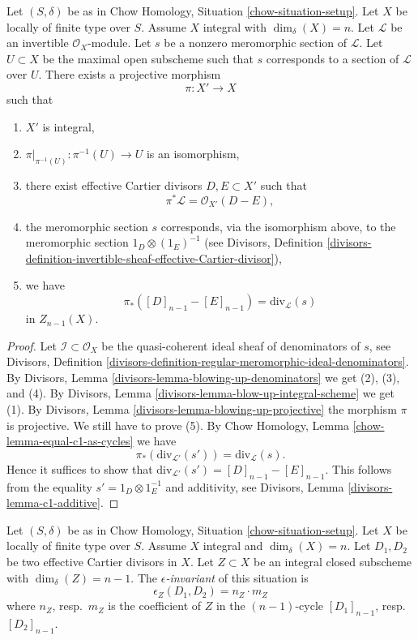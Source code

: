 \begin{lemma}
\label{lemma-blowing-up-denominators}
Let $(S, \delta)$ be as in Chow Homology, Situation \ref{chow-situation-setup}.
Let $X$ be locally of finite type over $S$.
Assume $X$ integral with $\dim_\delta(X) = n$.
Let $\mathcal{L}$ be an invertible $\mathcal{O}_X$-module.
Let $s$ be a nonzero meromorphic section of $\mathcal{L}$.
Let $U \subset X$ be the maximal open subscheme such that
$s$ corresponds to a section of $\mathcal{L}$ over $U$.
There exists a projective morphism
$$
\pi : X' \longrightarrow X
$$
such that
\begin{enumerate}
\item $X'$ is integral,
\item $\pi|_{\pi^{-1}(U)} : \pi^{-1}(U) \to U$ is an isomorphism,
\item there exist effective Cartier divisors $D, E \subset X'$
such that
$$
\pi^*\mathcal{L} = \mathcal{O}_{X'}(D - E),
$$
\item the meromorphic section $s$ corresponds, via the isomorphism above,
to the meromorphic section $1_D \otimes (1_E)^{-1}$ (see
Divisors, Definition
\ref{divisors-definition-invertible-sheaf-effective-Cartier-divisor}),
\item we have
$$
\pi_*([D]_{n - 1} - [E]_{n - 1}) = \text{div}_\mathcal{L}(s)
$$
in $Z_{n - 1}(X)$.
\end{enumerate}
\end{lemma}

\begin{proof}
Let $\mathcal{I} \subset \mathcal{O}_X$ be the quasi-coherent ideal sheaf
of denominators of $s$, see Divisors, Definition
\ref{divisors-definition-regular-meromorphic-ideal-denominators}.
By Divisors, Lemma \ref{divisors-lemma-blowing-up-denominators}
we get (2), (3), and (4).
By Divisors, Lemma \ref{divisors-lemma-blow-up-integral-scheme}
we get (1). By Divisors, Lemma \ref{divisors-lemma-blowing-up-projective}
the morphism $\pi$ is projective.
We still have to prove (5).
By Chow Homology, Lemma \ref{chow-lemma-equal-c1-as-cycles} we have
$$
\pi_*(\text{div}_{\mathcal{L}'}(s')) = \text{div}_\mathcal{L}(s).
$$
Hence it suffices to show that
$\text{div}_{\mathcal{L}'}(s') = [D]_{n - 1} - [E]_{n - 1}$.
This follows from the equality
$s' = 1_D \otimes 1_E^{-1}$ and additivity, see
Divisors, Lemma \ref{divisors-lemma-c1-additive}.
\end{proof}

\begin{definition}
\label{definition-epsilon}
Let $(S, \delta)$ be as in Chow Homology, Situation \ref{chow-situation-setup}.
Let $X$ be locally of finite type over $S$.
Assume $X$ integral and $\dim_\delta(X) = n$.
Let $D_1, D_2$ be two effective Cartier divisors in $X$.
Let $Z \subset X$ be an integral closed subscheme
with $\dim_\delta(Z) = n - 1$. The {\it $\epsilon$-invariant}
of this situation is
$$
\epsilon_Z(D_1, D_2) = n_Z \cdot m_Z
$$
where $n_Z$, resp.\ $m_Z$ is the coefficient of
$Z$ in the $(n - 1)$-cycle $[D_1]_{n - 1}$, resp.\ $[D_2]_{n - 1}$.
\end{definition}

